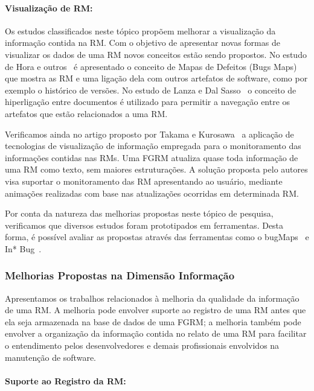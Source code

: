 \paragraph{Visualização de RM:} Os estudos classificados neste tópico propõem
melhorar a visualização da informação contida na RM\@. Com o objetivo de
apresentar novas formas de visualizar os dados de uma RM novos conceitos estão
sendo propostos. No estudo de Hora e outros~\cite{hora2012bug} é apresentado o
conceito de Mapas de Defeitos (Bugs Maps) que mostra as RM e uma ligação dela
com outros artefatos de software, como por exemplo o histórico de versões.  No
estudo de Lanza e  Dal Sasso~\cite{dal2014bug} o conceito de hiperligação entre
documentos é utilizado para permitir a navegação entre os artefatos que estão
relacionados a uma RM\@.

Verificamos ainda no artigo proposto por Takama e
Kurosawa~\cite{takama2013application} a aplicação de tecnologias de visualização
de informação empregada para o monitoramento das informações contidas nas RMs.
Uma FGRM atualiza quase toda informação de uma RM como texto, sem maiores
estruturações. A solução proposta pelo autores visa suportar o monitoramento das
RM apresentando ao usuário, mediante animações realizadas com base nas
atualizações ocorridas em determinada RM\@.

Por conta da natureza das melhorias propostas neste tópico de pesquisa,
verificamos que diversos estudos foram prototipados em ferramentas. Desta forma,
é possível avaliar as propostas através das ferramentas como o
bugMaps~\cite{hora2012bug} e In* Bug~\cite{dal2014bug}.

\subsubsection{Melhorias Propostas na Dimensão Informação}
\label{ssub:melhorias_dim_informacao}

Apresentamos os trabalhos relacionados à melhoria da qualidade da informação de
uma RM\@. A melhoria pode envolver suporte ao registro de uma RM antes que ela
seja armazenada na base de dados de uma FGRM\@; a melhoria também pode envolver
a organização da informação contida no relato de uma RM para facilitar o
entendimento pelos desenvolvedores e demais profissionais envolvidos na
manutenção de software.

\paragraph{Suporte ao Registro da RM:}

